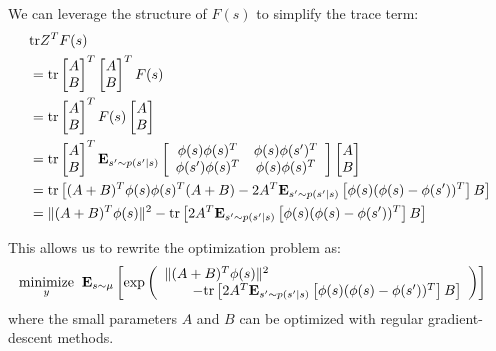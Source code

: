 We can leverage the structure of $F(s)$ to simplify the trace term:
\begin{align}
   & \text{tr} Z^T F(s)
  \\ & = \text{tr} \begin{bmatrix} A \\ B \end{bmatrix}^T \begin{bmatrix} A \\ B \end{bmatrix}^T F(s)
  \\ & = \text{tr} \begin{bmatrix} A \\ B \end{bmatrix}^T F(s) \begin{bmatrix} A \\ B \end{bmatrix}
  \\ & = \text{tr} \begin{bmatrix} A \\ B \end{bmatrix}^T  \mathbf{E}_{s' \sim p(s'|s)}  \left[ \begin{array}{cc} \phi(s)\phi(s)^T & \phi(s)\phi(s')^T \\ \phi(s')\phi(s)^T & \phi(s)\phi(s)^T \end{array} \right]
  \begin{bmatrix} A \\ B \end{bmatrix}
  \\  & = \text{tr} \left[
    (A + B)^T \phi(s)\phi(s)^T (A+B)
    - 2A^T \mathbf{E}_{s' \sim p(s'|s)} \left [\phi(s)(\phi(s)- \phi(s'))^T \right ] B
    \right]
  \\  & = \| (A + B)^T \phi(s) \|^2 - \text{tr} \left[
    2A^T \mathbf{E}_{s' \sim p(s'|s)} \left[ \phi(s)(\phi(s)- \phi(s'))^T \right] B
    \right]
\end{align}


This allows us to rewrite the optimization problem as:
\begin{align}
  \underset{y}{\text{minimize}} & \;\; \mathbf{E}_{s\sim\mu} \left [ \exp\left(
    \begin{array}{l}
      \| (A + B)^T \phi(s) \|^2
      \\ \qquad- \text{tr} \left[
        2A^T \mathbf{E}_{s' \sim p(s'|s)} \left[ \phi(s)(\phi(s)- \phi(s'))^T \right] B
        \right]
    \end{array}
    \right) \right ]
\end{align}
where the small parameters $A$ and $B$ can be optimized with regular gradient-descent methods.



